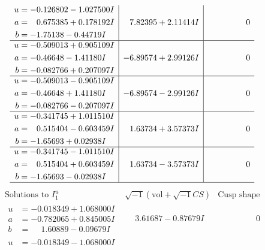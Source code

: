 \documentclass[1p]{elsarticle_modified}
\theoremstyle{definition}
\newcommand{\I}{\sqrt{-1}}
\begin{document}
$$\begin{array}{c|c|c}
\begin{aligned}
u &= -0.126802 - 1.027500 I \\
a &= \phantom{-}0.675385 + 0.178192 I \\
b &= -1.75138 - 0.44719 I\end{aligned}
 & \phantom{-}7.82395 + 2.11414 I & \phantom{-0.000000 } 0 \\ \hline\begin{aligned}
u &= -0.509013 + 0.905109 I \\
a &= -0.46648 - 1.41180 I \\
b &= -0.082766 + 0.207097 I\end{aligned}
 & -6.89574 + 2.99126 I & \phantom{-0.000000 } 0 \\ \hline\begin{aligned}
u &= -0.509013 - 0.905109 I \\
a &= -0.46648 + 1.41180 I \\
b &= -0.082766 - 0.207097 I\end{aligned}
 & -6.89574 - 2.99126 I & \phantom{-0.000000 } 0 \\ \hline\begin{aligned}
u &= -0.341745 + 1.011510 I \\
a &= \phantom{-}0.515404 - 0.603459 I \\
b &= -1.65693 + 0.02938 I\end{aligned}
 & \phantom{-}1.63734 + 3.57373 I & \phantom{-0.000000 } 0 \\ \hline\begin{aligned}
u &= -0.341745 - 1.011510 I \\
a &= \phantom{-}0.515404 + 0.603459 I \\
b &= -1.65693 - 0.02938 I\end{aligned}
 & \phantom{-}1.63734 - 3.57373 I & \phantom{-0.000000 } 0\\
 \hline 
 \end{array}$$\newpage$$\begin{array}{c|c|c}  
\text{Solutions to }I^u_{1}& \I (\text{vol} + \sqrt{-1}CS) & \text{Cusp shape}\\
 \hline 
\begin{aligned}
u &= -0.018349 + 1.068000 I \\
a &= -0.782065 + 0.845005 I \\
b &= \phantom{-}1.60889 - 0.09679 I\end{aligned}
 & \phantom{-}3.61687 - 0.87679 I & \phantom{-0.000000 } 0 \\ \hline\begin{aligned}
u &= -0.018349 - 1.068000 I \\

\end{aligned}
\end{array}$$
\end{document}
